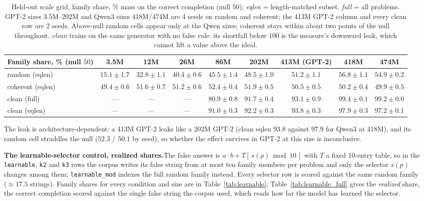 \documentclass{article}
\begin{document}
\begin{table}[ht]
\centering\scriptsize
\setlength{\tabcolsep}{2pt}
\begin{tabular}{lcccccccc}
\toprule
Family share, \% (null $50$) & 3.5M & 12M & 26M & 86M & 202M & 413M (GPT-2) & 418M & 474M \\
\midrule
random (eqlen)   & $15.1 \pm 1.7$ & $32.8 \pm 1.1$ & $40.4 \pm 0.6$ & $45.5 \pm 1.4$ & $48.5 \pm 1.0$ & $51.2 \pm 1.1$ & $\mathbf{56.8 \pm 1.1}$ & $\mathbf{54.9 \pm 0.2}$ \\
coherent (eqlen) & $49.4 \pm 0.6$ & $51.6 \pm 0.7$ & $51.2 \pm 0.6$ & $52.4 \pm 0.4$ & $51.9 \pm 0.5$ & $50.5 \pm 0.5$ & $50.2 \pm 0.4$ & $49.9 \pm 0.5$ \\
clean (full)     & --- & --- & --- & $80.9 \pm 0.8$ & $91.7 \pm 0.4$ & $93.1 \pm 0.9$ & $99.4 \pm 0.1$ & $99.2 \pm 0.0$ \\
clean (eqlen)    & --- & --- & --- & $91.0 \pm 0.3$ & $92.2 \pm 0.3$ & $93.8 \pm 0.3$ & $97.9 \pm 0.3$ & $97.2 \pm 0.1$ \\
\bottomrule
\end{tabular}
\caption{Held-out scale grid, family share, \% mass on the correct completion (null $50$); \emph{eqlen} = length-matched subset, \emph{full} = all problems. GPT-2 sizes 3.5M--202M and Qwen3 sizes 418M/474M are 4 seeds on random and coherent; the 413M GPT-2 column and every clean row are 2 seeds. Above-null random cells appear only at the Qwen sizes; coherent stays within about two points of the null throughout. \emph{clean} trains on the same generator with no false rule: its shortfall below $100$ is the measure's downward leak, which cannot lift a value above the ideal.}
\label{tab:scale_grid}
\end{table}

The leak is architecture-dependent: a 413M GPT-2 leaks like a 202M GPT-2 (clean eqlen $93.8$ against $97.9$ for Qwen3 at 418M), and its random cell straddles the null ($52.3$ / $50.1$ by seed), so whether the effect survives in GPT-2 at this size is inconclusive.

\textbf{The learnable-selector control, realized shares.}\quad The false answer is $a{\cdot}b + T[\,s(p)\bmod 10\,]$ with $T$ a fixed 10-entry table, so in the \texttt{learnable}, \texttt{k2} and \texttt{k3} rows the corpus writes its false string from at most ten family members per problem and only the selector $s(p)$ changes among them; \texttt{learnable\_mod} indexes the full random family instead. Every selector row is scored against the same random family (${\approx}17.5$ strings). Family shares for every condition and size are in Table~\ref{tab:learnable}; Table~\ref{tab:learnable_full} gives the \emph{realized} share, the correct completion scored against the single false string the corpus used, which reads how far the model has learned the selector.
\end{document}
